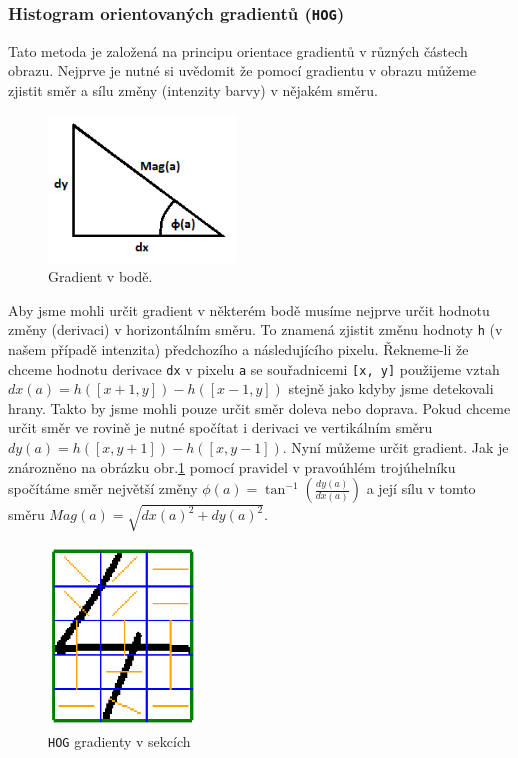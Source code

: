 \documentclass[12pt]{article}
\begin{document}
\subsubsection{Histogram orientovaných gradientů (\texttt{HOG})}
Tato metoda je založená na principu orientace gradientů v různých částech obrazu. Nejprve je nutné si uvědomit že pomocí gradientu v obrazu můžeme zjistit směr a sílu změny (intenzity barvy) v nějakém směru.

\begin{figure}
\includegraphics[width=5cm]{Gradient.png}
\caption{Gradient v bodě.}
\label{obr3}
\end{figure}

Aby jsme mohli určit gradient v některém bodě musíme nejprve určit hodnotu změny (derivaci) v horizontálním směru. To znamená zjistit změnu hodnoty \texttt{h} (v našem případě intenzita) předchozího a následujícího pixelu. Řekneme-li že chceme hodnotu derivace \texttt{dx} v pixelu \texttt{a} se souřadnicemi \texttt{[x, y]} použijeme vztah $dx(a) = h([x+1, y]) - h([x-1, y])$ stejně jako kdyby jsme detekovali hrany. Takto by jsme mohli pouze určit směr doleva nebo doprava. Pokud chceme určit směr ve rovině je nutné spočítat i derivaci ve vertikálním směru $dy(a) = h([x, y+1]) - h([x, y-1])$. Nyní můžeme určit gradient. Jak je znározněno na obrázku obr.\ref{obr3} pomocí pravidel v pravoúhlém trojúhelníku spočítáme směr největší změny 
{$\phi(a) = \tan^{-1}(\frac{dy(a)}{dx(a)})$} a její sílu v tomto směru $Mag(a) = \sqrt{dx(a)^2 + dy(a)^2}$.

\begin{figure}
\vspace{-0.5cm}
\centering
\includegraphics[width=4cm]{Hog.png}
\caption{\texttt{HOG} gradienty v sekcích}
\label{obr4}
\end{figure}
\end{document}

